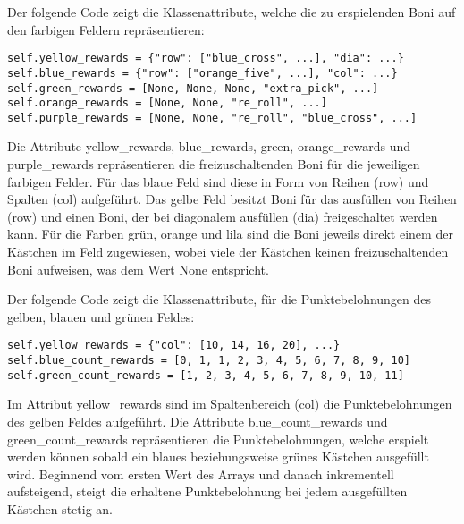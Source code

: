\begin{minipage}{\linewidth}
Der folgende Code zeigt die Klassenattribute, welche die zu erspielenden Boni auf den farbigen Feldern repräsentieren:
\vspace{0.5cm}
\begin{lstlisting}[caption={Klassenattribute für freizuschaltende Boni}]
self.yellow_rewards = {"row": ["blue_cross", ...], "dia": ...}
self.blue_rewards = {"row": ["orange_five", ...], "col": ...}
self.green_rewards = [None, None, None, "extra_pick", ...]
self.orange_rewards = [None, None, "re_roll", ...]
self.purple_rewards = [None, None, "re_roll", "blue_cross", ...]
\end{lstlisting}
\end{minipage}

Die Attribute yellow\_rewards, blue\_rewards, green, orange\_rewards und purple\_rewards repräsentieren die freizuschaltenden Boni für die jeweiligen farbigen Felder. Für das blaue Feld sind diese in Form von Reihen (row) und Spalten (col) aufgeführt. Das gelbe Feld besitzt Boni für das ausfüllen von Reihen (row) und einen Boni, der bei diagonalem ausfüllen (dia) freigeschaltet werden kann. Für die Farben grün, orange und lila sind die Boni jeweils direkt einem der Kästchen im Feld zugewiesen, wobei viele der Kästchen keinen freizuschaltenden Boni aufweisen, was dem Wert None entspricht.\\

\begin{minipage}{\linewidth}
Der folgende Code zeigt die Klassenattribute, für die Punktebelohnungen des gelben, blauen und grünen Feldes:
\vspace{0.5cm}
\begin{lstlisting}[caption={Klassenattribute für Punktestand}]
self.yellow_rewards = {"col": [10, 14, 16, 20], ...}
self.blue_count_rewards = [0, 1, 1, 2, 3, 4, 5, 6, 7, 8, 9, 10]
self.green_count_rewards = [1, 2, 3, 4, 5, 6, 7, 8, 9, 10, 11]
\end{lstlisting}
\end{minipage}

Im Attribut yellow\_rewards sind im Spaltenbereich (col) die Punktebelohnungen des gelben Feldes aufgeführt. Die Attribute blue\_count\_rewards und green\_count\_rewards repräsentieren die Punktebelohnungen, welche erspielt werden können sobald ein blaues beziehungsweise grünes Kästchen ausgefüllt wird. Beginnend vom ersten Wert des Arrays und danach inkrementell aufsteigend, steigt die erhaltene Punktebelohnung bei jedem ausgefüllten Kästchen stetig an.\\


